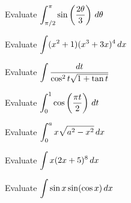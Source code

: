 \documentclass[notes]{subfiles}
\begin{document}
		\begin{ex}
			Evaluate $\displaystyle \int_{\pi/2}^\pi \sin\left( \dfrac{2\theta}{3}\right)\,d\theta$
		\end{ex}
			\newpage
			
		\begin{ex}
			Evaluate $\displaystyle \int (x^2+1)(x^3+3x)^4\,dx$
		\end{ex}
			
		\begin{ex}
			Evaluate $\displaystyle \int \dfrac{dt}{\cos^2t\sqrt{1+\tan t}}$
		\end{ex}
			
		\begin{ex}
			Evaluate $\displaystyle \int_0^1\cos\left( \dfrac{\pi t}{2}\right)\, dt$
		\end{ex}
			\newpage
			
		\begin{ex}
			Evaluate $\displaystyle \int_0^a x\sqrt{a^2-x^2}\,dx$
		\end{ex}
			
		\begin{ex}
			Evaluate $\displaystyle \int x(2x+5)^8\,dx$
		\end{ex}	
			
		\begin{ex}
			Evaluate $\displaystyle \int \sin x\sin (\cos x)\,dx$
		\end{ex}
	

	
\clearpage
\end{document}
